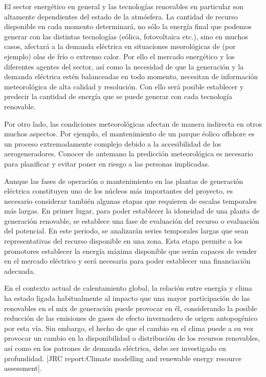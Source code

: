 El sector energético en general y las tecnologías renovables en particular son altamente dependientes del estado de la atmósfera. La cantidad de recurso disponible en cada momento determinará, no sólo la energía final que podemos generar con las distintas tecnologías (eólica, fotovoltaica etc.), sino en muchos casos, afectará a la demanda eléctrica en situaciones meorológicas de (por ejemplo) olas de frío o extremo calor. Por ello el mercado energético y los diferentes agentes del sector, así como la necesidad de que la generación y la demanda eléctrica estén balanceadas en todo momento, necesitan de información meteorológica de alta calidad y resolución. Con ello será posible establecer y predecir la cantidad de energía que se puede generar con cada tecnología renovable. 

Por otro lado, las condiciones meteorológicas afectan de manera indirecta en otros muchos aspectos. Por ejemplo, el mantenimiento de un parque éolico offshore es un proceso extremadamente complejo debido a la accesibilidad de los aerogeneradores. Conocer de antemano la predicción meteorológica es necesario para planificar y evitar poner en riesgo a las personas implicadas.  

Aunque las fases de operación o mantenimiento en las plantas de generación eléctrica constituyen uno de los núcleos más importantes del proyecto, es necesario considerar también algunas etapas que requieren de escalas temporales más largas. En primer lugar, para poder establecer la idoneidad de una planta de generación renovable, se establece una fase de evaluación del recurso o evaluación del potencial. En este periodo, se analizarán series temporales largas que sean representativas del recurso disponible en una zona. Esta etapa permite a los promotores establecer la energía máxima disponible que serán capaces de vender en el mercado eléctrico y será necesaria para poder establecer una financiación adecuada.

En el contexto actual de calentamiento global, la relación entre energía y clima ha estado ligada habitualmente al impacto que una mayor participación de las renovables en el mix de generación puede provocar en él, considerando la posible reducción de las emisiones de gases de efecto invernadero de origen antopogénico por esta vía. Sin embargo, el hecho de que el cambio en el clima puede a su vez provocar un cambio en la disponibilidad o distribución de los recursos renovables, así como en los patrones de demanda eléctrica, debe ser investigado en profundidad. [JRC report:Climate modelling and renewable energy resource assessment].

